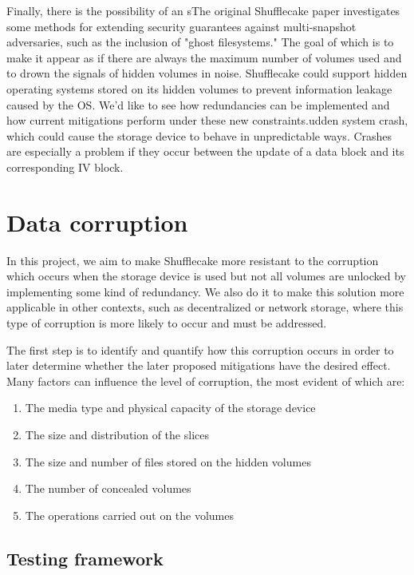 \documentclass[a4paper,11pt,oneside]{report}
\begin{document}
Finally, there is the possibility of an sThe original Shufflecake paper investigates some methods for extending security guarantees against multi-snapshot adversaries, such as the inclusion of "ghost filesystems." The goal of which is to make it appear as if there are always the maximum number of volumes used and to drown the signals of hidden volumes in noise. Shufflecake could support hidden operating systems stored on its hidden volumes to prevent information leakage caused by the OS. We'd like to see how redundancies can be implemented and how current mitigations perform under these new constraints.udden system crash, which could cause the storage device to behave in unpredictable ways. Crashes are especially a problem if they occur between the update of a data block and its corresponding IV block.

\let\clearpage\relax

\chapter{Data corruption}

In this project, we aim to make Shufflecake more resistant to the corruption which occurs when the storage device is used but not all volumes are unlocked by implementing some kind of redundancy. We also do it to make this solution more applicable in other contexts, such as decentralized or network storage, where this type of corruption is more likely to occur and must be addressed.

The first step is to identify and quantify how this corruption occurs in order to later determine whether the later proposed mitigations have the desired effect. Many factors can influence the level of corruption, the most evident of which are:
\begin{enumerate}
    \item The media type and physical capacity of the storage device
    \item The size and distribution of the slices
    \item The size and number of files stored on the hidden volumes
    \item The number of concealed volumes
    \item The operations carried out on the volumes
\end{enumerate}

\section{Testing framework}
\end{document}
